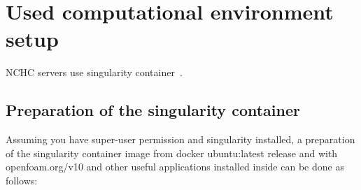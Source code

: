 \cleardoublepage

\section{Used computational environment setup}
\label{sec:env}

NCHC servers use singularity container~\cite{singularity}.

\subsection{Preparation of the singularity container}
\label{subsec:prepCont}

Assuming you have super-user permission and singularity installed, a preparation of the singularity container image from docker ubuntu:latest release and with openfoam.org/v10 and other useful applications installed inside can be done as follows:
